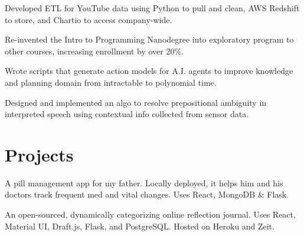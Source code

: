 \documentclass[]{deedy-resume-openfont}
\begin{document}
\begin{minipage}[t]{0.66\textwidth}
\begin{tightemize}
\end{tightemize}
\sectionsep

\begin{tightemize}

\item Developed ETL for YouTube data using Python to pull and clean, AWS Redshift to store, and Chartio to access company-wide.
\item Re-invented the Intro to Programming Nanodegree into exploratory program to other courses, increasing enrollment by over 20\%.

\end{tightemize}
\sectionsep

\begin{tightemize}
\item Wrote scripts that generate action models for A.I. agents to improve knowledge and planning domain from intractable to polynomial time.
\item Designed and implemented an algo to resolve prepositional ambiguity in interpreted speech using contextual info collected from sensor data.
\end{tightemize}
\sectionsep

\section{Projects}

\begin{tightemize}
\item A pill management app for my father. Locally deployed, it helps him and his doctors track frequent med and vital changes. Uses React, MongoDB \& Flask.
\end{tightemize}
\sectionsep

\begin{tightemize}
\item An open-sourced, dynamically categorizing online reflection journal. Uses React, Material UI, Draft.js, Flask, and PostgreSQL. Hosted on Heroku and Zeit.
\end{tightemize}
\sectionsep


\end{minipage}
\end{document}
